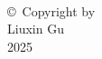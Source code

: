 
\thispagestyle{empty}
\hbox{\ }

\vfill
\renewcommand{\baselinestretch}{1}
\small\normalsize

\vspace{.5in}

\begin{center}
\large{\copyright \hbox{ }Copyright by\\
Liuxin Gu  %
\\
2025}
\end{center}

\vfill

\newpage 
